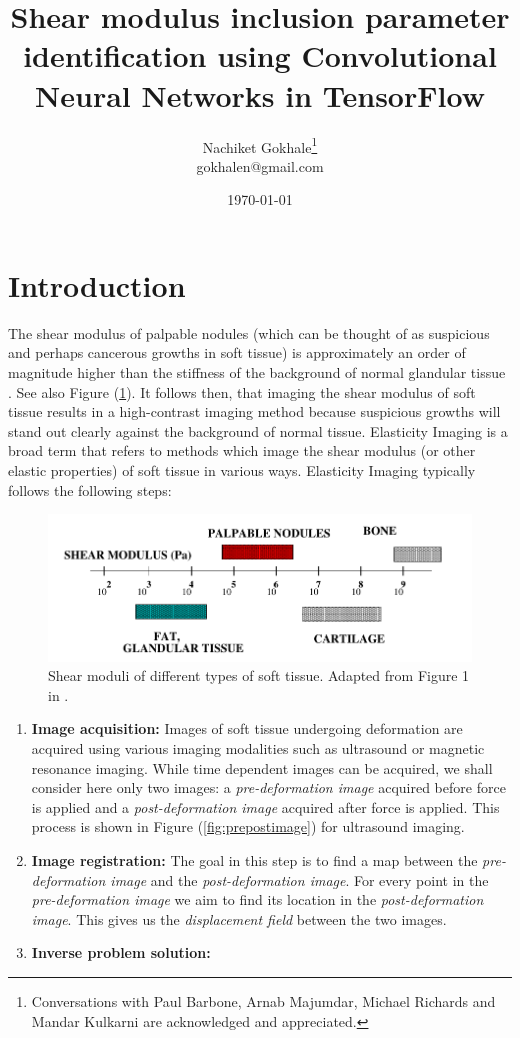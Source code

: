 \documentclass[12pt]{article}
\begin{document}
\title{Shear modulus inclusion parameter identification using Convolutional Neural Networks in TensorFlow}
\author{Nachiket Gokhale\footnote{Conversations with Paul Barbone, Arnab Majumdar, Michael Richards and Mandar Kulkarni are acknowledged and appreciated.}\\gokhalen@gmail.com}
\date{\today}
\maketitle
\abstract{}
\section{Introduction}
The shear modulus of palpable nodules (which can be thought of as suspicious and perhaps cancerous growths in soft tissue) is approximately an order of magnitude higher than the stiffness of the background of normal glandular tissue \cite{paper:sarv1998}. See also Figure (\ref{fig:shearmod}). It follows then, that imaging the shear modulus of soft tissue results in a high-contrast imaging method because suspicious growths will stand out clearly against the background of normal tissue. Elasticity Imaging is a broad term that refers to methods which image the shear modulus (or other elastic properties) of soft tissue in various ways. Elasticity Imaging typically follows the following steps:
%
\begin{figure}
   \centering
    \includegraphics[totalheight=3cm]{Figures/shearmod.png}
  \caption{\label{fig:shearmod} Shear moduli of different types of soft tissue. Adapted from Figure 1 in \cite{paper:sarv1998}.}
\end{figure}
%
\begin{enumerate}
\item{\textbf{Image acquisition:} Images of soft tissue undergoing deformation are acquired using various imaging modalities such as ultrasound or magnetic resonance imaging. While time dependent images can be acquired, we shall consider here only two images: a \textit{pre-deformation image} acquired before force is applied and a \textit{post-deformation image} acquired after force is applied. This process is shown in Figure (\ref{fig:prepostimage}) for ultrasound imaging.}
\item{\textbf{Image registration:} The goal in this step is to find a map between the \textit{pre-deformation image} and the \textit{post-deformation image}. For every point in the \textit{pre-deformation image} we aim to find its location in the \textit{post-deformation image}. This gives us the \textit{displacement field} between the two images.}
\item{\textbf{Inverse problem solution:}}
\end{enumerate}
\end{document}
